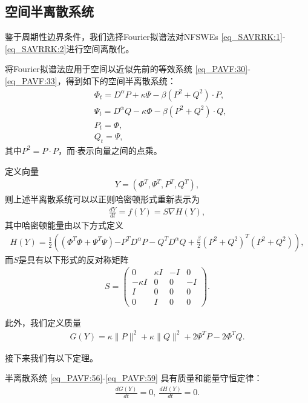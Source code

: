 \subsection{空间半离散系统}

鉴于周期性边界条件，我们选择Fourier拟谱法对NFSWEs \eqref{eq_SAVRRK:1}-\eqref{eq_SAVRRK:2}进行空间离散化。

将Fourier拟谱法应用于空间以近似先前的等效系统 \eqref{eq_PAVF:30}-\eqref{eq_PAVF:33}，得到如下的空间半离散系统：
\begin{align}
&\varPhi_{t}=D^{\alpha}P+\kappa \Psi-\beta \left( P^{2}+Q^{2}\right)\cdot P,\label{eq_PAVF:56}\\
&\Psi_{t}=D^{\alpha}Q-\kappa \varPhi-\beta \left( P^{2}+Q^{2}\right)\cdot Q,\label{eq_PAVF:57}\\
&P_t=\varPhi,\label{eq_PAVF:58}\\
&Q_t=\Psi,\label{eq_PAVF:59}
\end{align}
其中$P^{2}=P \cdot P$，而$\cdot$表示向量之间的点乘。

定义向量
\begin{align}\label{eq_PAVF:60a}
Y=\left(\varPhi^{T}, \Psi^{T}, P^{T}, Q^{T}\right),
\end{align}
则上述半离散系统可以以正则哈密顿形式重新表示为
\begin{align}\label{eq_PAVF:60}
\frac{d Y}{d t}=f(Y)=S \nabla H(Y),
\end{align}
其中哈密顿能量由以下方式定义
\begin{align}\label{eq_PAVF:61}
	H(Y)=\frac{1}{2}\left((\varPhi^{T}\varPhi+\Psi^{T}\Psi){-P^{T} D^{\alpha} P-Q^{T} D^{\alpha} Q}+\frac{\beta}{2}(P^2+Q^2)^{T}(P^2+Q^2)\right),
\end{align}
而$S$是具有以下形式的反对称矩阵
\begin{align}\label{eq_PAVF:62}
S=\left(\begin{array}{cccc}
0 & \kappa I & -I & 0 \\
-\kappa I & 0 & 0 & -I \\
I & 0 & 0 & 0 \\
0 & I & 0 & 0
\end{array}\right).
\end{align}

此外，我们定义质量
\begin{align}\label{eq_PAVF:63}
G(Y)=\kappa\|P\|^{2}+\kappa\|Q\|^{2} +2\Psi^{T}P-2\varPhi^{T}Q.
\end{align}

接下来我们有以下定理。

\begin{theorem}	\label{thm_PAVF:3}
	半离散系统 \eqref{eq_PAVF:56}-\eqref{eq_PAVF:59} 具有质量和能量守恒定律：
\begin{align}
\frac{d G(Y)}{d t}=0,~\frac{d H(Y)}{d t}=0.
\end{align}
\end{theorem}

